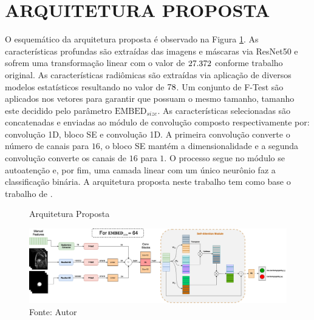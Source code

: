\section{ARQUITETURA PROPOSTA}
\label{subsec:cap4_architecture}


O esquemático da arquitetura proposta é observado na Figura \ref{fig:fig011}. As características profundas são extraídas das imagens e máscaras via ResNet50 e sofrem uma transformação linear com o valor de $27.372$ conforme trabalho original. As características radiômicas são extraídas via aplicação de diversos modelos estatísticos resultando no valor de $78$. Um conjunto de F-Test são aplicados nos vetores para garantir que possuam o mesmo tamanho, tamanho este decidido pelo parâmetro $\text{EMBED}_{size}$. As características selecionadas são concatenadas e enviadas ao módulo de convolução composto respectivamente por: convolução 1D, bloco \gls{SE} e convolução 1D. A primeira convolução converte o número de canais para $16$, o bloco \gls{SE} mantém a dimensionalidade e a segunda convolução converte os canais de $16$ para $1$. O processo segue no módulo se autoatenção e, por fim, uma camada linear com um único neurônio faz a classificação binária. A arquitetura proposta neste trabalho tem como base o trabalho de \cite{aiSelfAttentionBasedFusion2023}.
\newline

\begin{figure}[H]
    \centering
    \caption{Arquitetura Proposta}
    \includegraphics[width=1.02\textwidth]{figures/fig011.png}
    \caption*{Fonte: Autor}
    \label{fig:fig011}
\end{figure}

